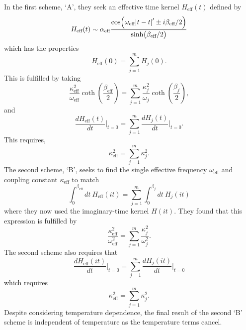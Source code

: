 In the first scheme, `A', they seek an effective time kernel $H_{\text{eff}}(t)$ defined by
\begin{equation}
    H_{\text{eff}}(t) \sim \alpha_{\text{eff}} \frac{\cos(\omega_{\text{eff}}\abs{t - t}' \pm i\beta_{\text{eff}} / 2)}{\sinh(\beta_{\text{eff}} / 2)}
\end{equation}
which has the properties
\begin{equation} \label{eqn:hellwarth_scheme_s}
    H_{\text{eff}}(0) = \sum_{j=1}^m H_{j}(0).
\end{equation}
This is fulfilled by taking
\begin{equation}
    \frac{\kappa_{\text{eff}}^2}{\omega_{\text{eff}}} \coth(\frac{\beta_{\text{eff}}}{2}) = \sum_{j=1}^m \frac{\kappa_{j}^2}{\omega_{j}} \coth(\frac{\beta_{j}}{2}),
\end{equation}
and
\begin{equation}
    \frac{dH_{\text{eff}}(t)}{dt} \biggr\rvert_{t=0} = \sum_{j=1}^m \frac{dH_{j}(t)}{dt} \biggr\rvert_{t=0}.
\end{equation}
This requires,
\begin{equation}
    \kappa_{\text{eff}}^2 = \sum_{j=1}^m \kappa_j^2.
\end{equation}
The second scheme, `B', seeks to find the single effective frequency $\omega_{\text{eff}}$ and coupling constant $\kappa_{\text{eff}}$ to match
\begin{equation}
    \int^{\beta_{\text{eff}}}_0 dt\ H_{\text{eff}}(it) = \sum_{j = 1}^m \int^{\beta_j}_0 dt\ H_j(it)
\end{equation}
where they now used the imaginary-time kernel $H(it)$. They found that this expression is fulfilled by
\begin{equation}
    \frac{\kappa_{\text{eff}}^2}{\omega_{\text{eff}}^2} = \sum_{j = 1}^m \frac{\kappa_{j}^2}{\omega_{j}^2}.
\end{equation}
The second scheme also requires that
\begin{equation}
    \frac{dH_{\text{eff}}(it)}{dt} \biggr\rvert_{t=0} = \sum_{j=1}^m \frac{dH_{j}(it)}{dt} \biggr\rvert_{t=0}
\end{equation}
which requires
\begin{equation} \label{eqn:hellwarth_scheme_f}
    \kappa_{\text{eff}}^2 = \sum_{j=1}^m \kappa_j^2.
\end{equation}
Despite considering temperature dependence, the final result of the second `B' scheme is independent of temperature as the temperature terms cancel.

